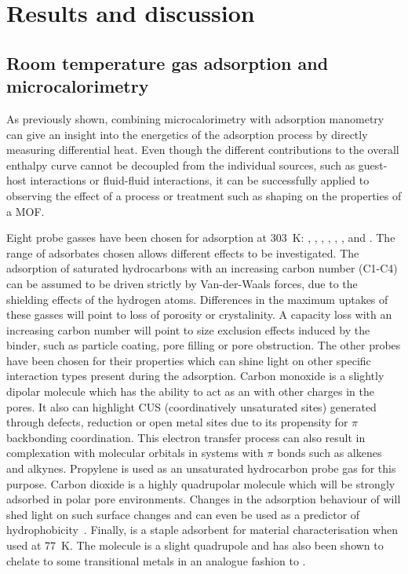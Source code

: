 
\section{Results and discussion}




\subsection{Room temperature gas adsorption and microcalorimetry}

As previously shown, combining microcalorimetry with adsorption manometry
can give an insight into the energetics of the
adsorption process by directly measuring differential heat.
Even though the different contributions to the overall enthalpy curve
cannot be decoupled from the individual sources, such as guest-host
interactions or fluid-fluid interactions, it can be successfully
applied to observing the effect of a process or treatment such as shaping
on the properties of a MOF.

Eight probe gasses have been chosen for adsorption at \SI{303}{\kelvin}:
, , , , , ,
 and .
The range of adsorbates chosen allows different effects to be investigated.
The adsorption of saturated hydrocarbons with an increasing
carbon number (C1-C4) can be
assumed to be driven strictly by Van-der-Waals forces,
due to the shielding effects of the hydrogen atoms.
Differences in the maximum uptakes of these gasses will point to
loss of porosity or crystalinity. A capacity loss with
an increasing carbon number will point to size exclusion effects
induced by the binder, such as particle coating, pore filling or
pore obstruction.
The other probes have been chosen for their properties which can
shine light on other specific interaction types
present during the adsorption.
Carbon monoxide is a slightly dipolar molecule which has the
ability to act as an with other charges in the pores.
It also can highlight CUS (coordinatively unsaturated sites)
generated through defects, reduction or open metal sites due to its
propensity for \( \pi \) backbonding coordination.
This electron transfer process can also result in complexation with molecular
orbitals in systems with \( \pi \) bonds such as alkenes and alkynes.
Propylene is used as an unsaturated hydrocarbon probe gas for this purpose.
Carbon dioxide is a highly quadrupolar molecule which will be
strongly adsorbed in polar pore environments. Changes in the adsorption
behaviour of  will shed light on such surface changes and
can even be used as a predictor
of hydrophobicity~\cite{chanutScreeningEffectWater2017}.
Finally,  is a staple adsorbent for material characterisation
when used at \SI{77}{\kelvin}. The molecule is a slight quadrupole
and has also been shown to chelate to some transitional metals in
an analogue fashion to .

